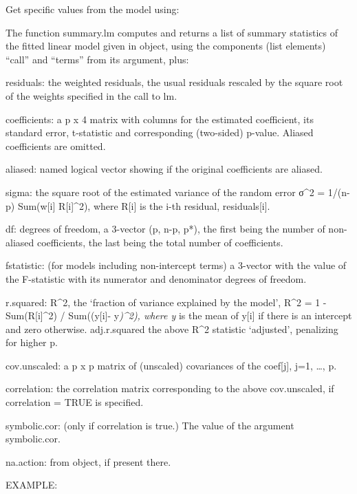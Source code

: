 \documentclass[]{article}
\newenvironment{Shaded}{\begin{snugshade}}{\end{snugshade}}
\newcommand{\KeywordTok}[1]{\textcolor[rgb]{0.13,0.29,0.53}{\textbf{#1}}}
\newcommand{\OperatorTok}[1]{\textcolor[rgb]{0.81,0.36,0.00}{\textbf{#1}}}
\newcommand{\NormalTok}[1]{#1}
\begin{document}
Get specific values from the model using:

The function summary.lm computes and returns a list of summary
statistics of the fitted linear model given in object, using the
components (list elements) ``call'' and ``terms'' from its argument,
plus:

residuals: the weighted residuals, the usual residuals rescaled by the
square root of the weights specified in the call to lm.

coefficients: a p x 4 matrix with columns for the estimated coefficient,
its standard error, t-statistic and corresponding (two-sided) p-value.
Aliased coefficients are omitted.

aliased: named logical vector showing if the original coefficients are
aliased.

sigma: the square root of the estimated variance of the random error
σ\^{}2 = 1/(n-p) Sum(w{[}i{]} R{[}i{]}\^{}2), where R{[}i{]} is the i-th
residual, residuals{[}i{]}.

df: degrees of freedom, a 3-vector (p, n-p, p*), the first being the
number of non-aliased coefficients, the last being the total number of
coefficients.

fstatistic: (for models including non-intercept terms) a 3-vector with
the value of the F-statistic with its numerator and denominator degrees
of freedom.

r.squared: R\^{}2, the `fraction of variance explained by the model',
R\^{}2 = 1 - Sum(R{[}i{]}\^{}2) / Sum((y{[}i{]}- y\emph{)\^{}2), where
y} is the mean of y{[}i{]} if there is an intercept and zero otherwise.
adj.r.squared the above R\^{}2 statistic `adjusted', penalizing for
higher p.

cov.unscaled: a p x p matrix of (unscaled) covariances of the
coef{[}j{]}, j=1, \ldots{}, p.

correlation: the correlation matrix corresponding to the above
cov.unscaled, if correlation = TRUE is specified.

symbolic.cor: (only if correlation is true.) The value of the argument
symbolic.cor.

na.action: from object, if present there.

EXAMPLE:

\begin{Shaded}
\end{Shaded}
\end{document}
